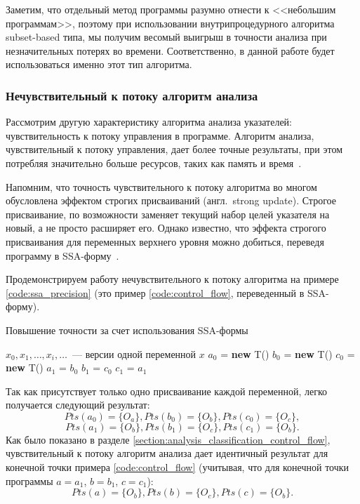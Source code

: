 \documentclass[14pt,titlepage]{extarticle}
\newcommand{\NEW}{\textbf{new }}
\newcommand{\eng}[1]{{\English#1}}
\newcommand{\engdef}[1]{(англ.~\eng{#1})}
\begin{document}
        Заметим, что отдельный метод программы разумно отнести к <<небольшим
        программам>>, поэтому при использовании внутрипроцедурного алгоритма
        \eng{subset-based} типа, мы получим весомый выигрыш в точности анализа
        при незначительных потерях во времени. Соответственно, в данной работе
        будет использоваться именно этот тип алгоритма.

      \subsubsection{Нечувствительный к потоку алгоритм анализа}
        \label{section:flow_sensetive_analysis}

        Рассмотрим другую характеристику алгоритма анализа указателей:
        чувствительность к потоку управления в программе.
        Алгоритм анализа, чувствительный к потоку управления, дает более точные
        результаты, при этом потребляя значительно больше ресурсов, таких как
        память и
        время~\cite[раздел.~4.4]{hind_pointer_analysis_not_solved_yet}.

        Напомним, что точность чувствительного к потоку алгоритма во многом
        обусловлена эффектом строгих присваиваний \engdef{strong update}.
        Строгое присваивание, по возможности заменяет текущий набор целей
        указателя на новый, а не просто расширяет его.
        Однако известно, что эффекта строгого присваивания для переменных
        верхнего уровня можно добиться, переведя программу в
        SSA-форму~\cite{points_to_with_efficient_strong_updates}.

        Продемонстрируем работу нечувствительного к потоку алгоритма на примере
        \ref{code:ssa_precision} (это пример \ref{code:control_flow},
        переведенный в SSA-форму).
        \begin{algorithm}
          \caption{Повышение точности за счет использования SSA-формы}
          \label{code:ssa_precision}
          \begin{algorithmic}[1]
            \REQUIRE $x_0, x_1, \ldots, x_i, \ldots$~--- версии одной переменной $x$
            \STATE $a_0$ = \NEW T()
            \STATE $b_0$ = \NEW T()
            \STATE $c_0$ = \NEW T()
            \STATE $a_1$ = $b_0$
            \STATE $b_1$ = $c_0$
            \STATE $c_1$ = $a_1$
          \end{algorithmic}
        \end{algorithm}

        Так как присутствует только одно присваивание каждой переменной, легко
        получается следующий результат:
        \[Pts(a_0) = \{O_a\}, Pts(b_0) = \{O_b\}, Pts(c_0) = \{O_c\},\]
        \[Pts(a_1) = \{O_b\}, Pts(b_1) = \{O_c\}, Pts(c_1) = \{O_b\}.\]
        Как было показано в разделе
        \ref{section:analysis_classification_control_flow},
        чувствительный к
        потоку алгоритм анализа дает идентичный результат для конечной точки
        примера \ref{code:control_flow} (учитывая, что для конечной точки
        программы $a = a_1$, $b = b_1$, $c = c_1$):
        \[Pts(a) = \{O_b\}, Pts(b) = \{O_c\}, Pts(c) = \{O_b\}.\]
\end{document}
